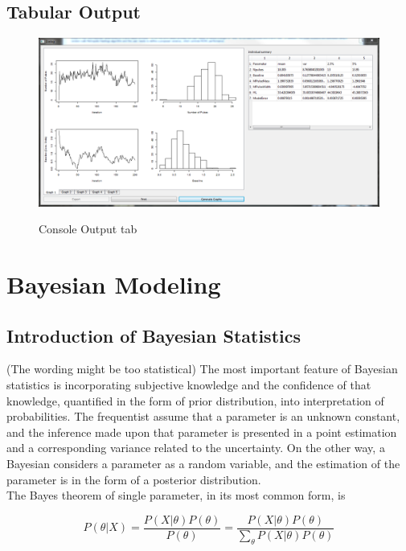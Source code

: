 \documentclass[11pt]{book}
\newcommand{\beq}{\begin{equation}}
\newcommand{\eeq}{\end{equation}}
\begin{document}
\section{Tabular Output}
\begin{figure}
  \centering
  \includegraphics[width=\textwidth]{grapho.PNG}\\
  \caption{Console Output tab}\label{console}
\end{figure}



\chapter{Bayesian Modeling}
\section{Introduction of Bayesian Statistics}
(The wording might be too statistical)
The most important feature of Bayesian statistics is incorporating subjective knowledge and the confidence of that knowledge, quantified in the form of prior distribution, into interpretation of probabilities. The frequentist assume that a parameter is an unknown constant, and the inference made upon that parameter is presented in a point estimation and a corresponding variance related to the uncertainty. On the other way, a Bayesian considers a parameter as a random variable, and the estimation of the parameter is in the form of a posterior distribution.\\
The Bayes theorem of single parameter, in its most common form, is

\beq
P(\theta|X)=\frac{P(X|\theta)P(\theta)}{P(\theta)} = \frac{P(X|\theta)P(\theta)}{\sum_\theta P(X|\theta)P(\theta)}
\eeq
\end{document}
